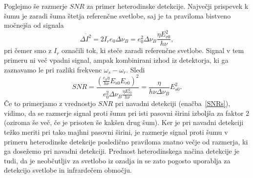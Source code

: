 Poglejmo še razmerje $SNR$ za primer heterodinske detekcije. Največji prispevek k šumu je 
zaradi šuma štetja referenčne svetlobe, saj je ta praviloma bistveno močnejša od signala
\begin{equation}
\overline{\Delta I^2} = 2I_re_0 \Delta\nu_B=e_0^2\Delta\nu_B\frac{\eta E_{r0}^2}{h\nu},
\end{equation}
pri čemer smo z $I_r$ označili tok, ki steče zaradi referenčne svetlobe. Signal v tem 
primeru ni več vpadni signal, ampak kombinirani izhod iz detektorja, ki ga zaznavamo
le pri razliki frekvenc $\omega_s-\omega_r$. Sledi
\begin{equation}
SNR = \frac{\left(\frac{e_0 \eta}{h \nu} E_{s0}E_{r0}\right)^2}{e_0^2\Delta\nu_B\frac{\eta 
E_{r0}^2}{h\nu}} = \frac{\eta}{h \nu \Delta\nu_B}E_{s0}^2.
\end{equation}
Če to primerjamo z vrednostjo $SNR$ pri navadni detekciji (enačba~\ref{SNRs}), vidimo, 
da se razmerje signal proti šumu pri isti pasovni širini izboljša za faktor $2$
(oziroma še več, če je prisoten še kakšen drug šum).
Ker je pri navadni detekciji težko meriti pri tako majhni pasovni širini, je razmerje
signal proti šumu v primeru heterodinske detekcije posledično praviloma znatno večje
od razmerja, ki ga dosežemo pri navadni detekciji. Prednost heterodinskega 
načina detekcije je tudi, da je neobčutljiv za svetlobo iz ozadja in se 
zato pogosto uporablja za detekcijo svetlobe in infrardečem območju.

